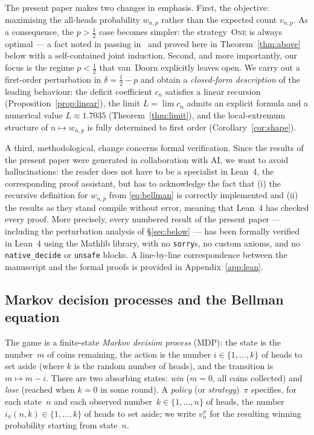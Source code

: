 \documentclass[12pt]{article}
\theoremstyle{definition}
\theoremstyle{remark}
\newcommand{\One}{\textsc{One}}
\begin{document}
The present paper makes two changes in emphasis.  First, the
objective: maximising the all-heads probability $w_{n,p}$ rather
than the expected count $v_{n,p}$. As a consequence, the $p>\tfrac12$ case becomes simpler: 
the strategy~\One{} is always optimal --- a fact noted in passing
in~\cite[\S 10]{vanDoorn2024} and proved here in
Theorem~\ref{thm:above} below with a self-contained joint
induction. Second, and more importantly, our focus is the regime
$p<\tfrac12$ that van~Doorn explicitly leaves open.  We carry out
a first-order perturbation in $\delta=\tfrac12-p$ and obtain a
\emph{closed-form description} of the leading behaviour: the
deficit coefficient $c_n$ satisfies a linear recursion
(Proposition~\ref{prop:linear}), the limit $L=\lim c_n$ admits an
explicit formula and a numerical value $L\approx
1.7035$ (Theorem~\ref{thm:limit}), and the local-extremum
structure of $n\mapsto w_{n,p}$ is fully determined to first order
(Corollary~\ref{cor:shape}).

A third, methodological, change concerns formal verification.
Since the results of the present paper were generated in collaboration with AI,
we want to avoid hallucinations: the reader does not have to be a specialist in Lean~4, 
the corresponding proof assistant, but has to acknowledge the fact that (i) the recursive definition
for $w_{n,p}$ from \eqref{eq:bellman} is correctly implemented and (ii) the results as they stand 
compile without error, meaning that Lean~4 has checked every proof. 
More precisely, every numbered result
of the present paper --- including the perturbation analysis of
\S\ref{sec:below} --- has been formally verified in Lean~4 using
the Mathlib library, with no \texttt{sorry}s, no custom axioms,
and no \texttt{native\_decide} or \texttt{unsafe} blocks.  A
line-by-line correspondence between the manuscript and the formal
proofs is provided in Appendix~\ref{app:lean}.

\subsection{Markov decision processes and the Bellman equation}

The game is a finite-state \emph{Markov decision process} (MDP): the
state is the number~$m$ of coins remaining, the action is the number
$i\in\{1,\dots,k\}$ of heads to set aside (where $k$ is the random
number of heads), and the transition is
$m\mapsto m-i$.  There are two absorbing states: \emph{win}
($m=0$, all coins collected) and \emph{lose} (reached when $k=0$ in
some round).  A \emph{policy} (or \emph{strategy})~$\pi$ specifies,
for each state~$n$ and each observed number~$k\in\{1,\dots,n\}$ of
heads, the number $i_\pi(n,k)\in\{1,\dots,k\}$ of heads to set
aside; we write $v_n^\pi$ for the resulting winning probability
starting from state~$n$.
\end{document}
